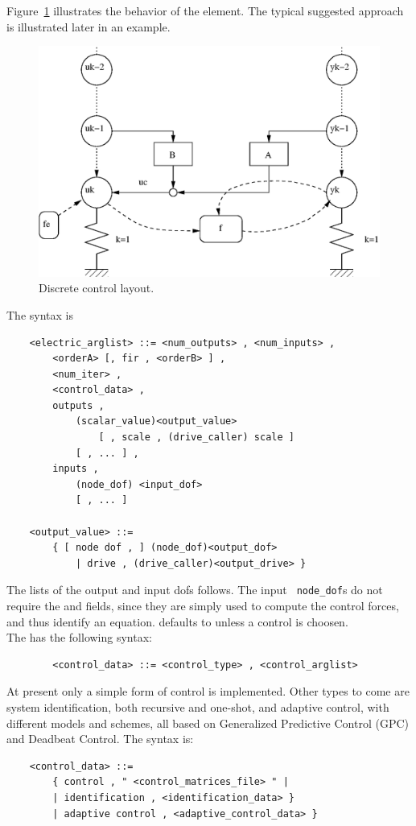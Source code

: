 Figure~\ref{fig:discctrl} illustrates the behavior of the element.
The typical suggested approach is illustrated later in an example.
\begin{figure}
\centering
{}
\includegraphics[width=.7\textwidth]{discctrl}
\caption{Discrete control layout.}
\label{fig:discctrl}
\end{figure}

The syntax is
\begin{verbatim}
    <electric_arglist> ::= <num_outputs> , <num_inputs> ,
        <orderA> [, fir , <orderB> ] ,
        <num_iter> ,
        <control_data> , 
        outputs ,
            (scalar_value)<output_value> 
                [ , scale , (drive_caller) scale ]
            [ , ... ] ,
        inputs ,
            (node_dof) <input_dof>
            [ , ... ]

    <output_value> ::=
        { [ node dof , ] (node_dof)<output_dof>
            | drive , (drive_caller)<output_drive> }
\end{verbatim}
The lists of the output and input dofs follows. The input {\tt
node\_dof}s do not require the  and  
fields, since they are simply
used to compute the control forces, and thus identify an equation.
 defaults to  unless a  control is choosen.\\
The  has the following syntax:
\begin{verbatim}  
        <control_data> ::= <control_type> , <control_arglist>
\end{verbatim}

At present only a simple form of control is implemented. Other types
to come are system identification, both recursive and one-shot, and
adaptive control, with different models and schemes, all based on 
Generalized Predictive Control (GPC) and Deadbeat Control.
The  syntax is:
\begin{verbatim}
    <control_data> ::=
        { control , " <control_matrices_file> " |
        | identification , <identification_data> }
        | adaptive control , <adaptive_control_data> }
\end{verbatim}


